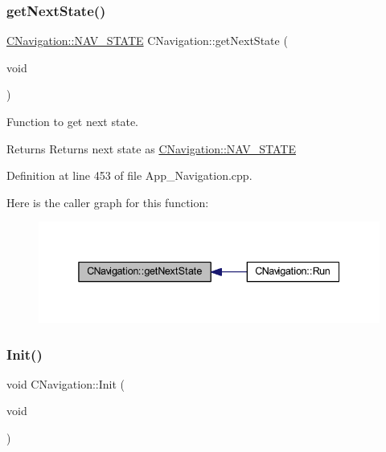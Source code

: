 \subsubsection{\texorpdfstring{get\+Next\+State()}{getNextState()}}
{\footnotesize\ttfamily \mbox{\hyperlink{class_c_navigation_add9fc966c7604990edf5c2a2e0eba32c}{C\+Navigation\+::\+N\+A\+V\+\_\+\+S\+T\+A\+TE}} C\+Navigation\+::get\+Next\+State (\begin{DoxyParamCaption}\item[{void}]{ }\end{DoxyParamCaption})\hspace{0.3cm}{\ttfamily [virtual]}}



Function to get next state. 

\begin{DoxyReturn}{Returns}
Returns next state as \mbox{\hyperlink{class_c_navigation_add9fc966c7604990edf5c2a2e0eba32c}{C\+Navigation\+::\+N\+A\+V\+\_\+\+S\+T\+A\+TE}} 
\end{DoxyReturn}


Definition at line 453 of file App\+\_\+\+Navigation.\+cpp.

Here is the caller graph for this function\+:
\nopagebreak
\begin{figure}[H]
\begin{center}
\leavevmode
\includegraphics[width=338pt]{class_c_navigation_afef253f37646558a755d956ecf2fc6e9_icgraph}
\end{center}
\end{figure}
\mbox{\label{class_c_navigation_a86a0756663ccf76e9c474764b8f7a04f}} 
\subsubsection{\texorpdfstring{Init()}{Init()}}
{\footnotesize\ttfamily void C\+Navigation\+::\+Init (\begin{DoxyParamCaption}\item[{void}]{ }\end{DoxyParamCaption})\hspace{0.3cm}{\ttfamily [virtual]}}



